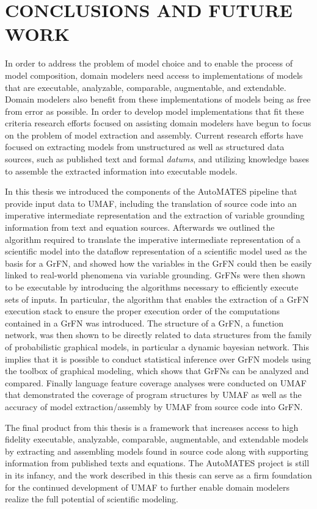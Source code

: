 \chapter{CONCLUSIONS AND FUTURE WORK\label{chapter:conc_and_future}}
In order to address the problem of model choice and to enable the process of model composition, domain modelers need access to implementations of models that are executable, analyzable, comparable, augmentable, and extendable.
Domain modelers also benefit from these implementations of models being as free from error as possible.
In order to develop model implementations that fit these criteria research efforts focused on assisting domain modelers have begun to focus on the problem of model extraction and assembly.
Current research efforts have focused on extracting models from unstructured as well as structured data sources, such as published text and formal \textit{datums}, and utilizing knowledge bases to assemble the extracted information into executable models.

In this thesis we introduced the components of the AutoMATES pipeline that provide input data to UMAF, including the translation of source code into an imperative intermediate representation and the extraction of variable grounding information from text and equation sources.
Afterwards we outlined the algorithm required to translate the imperative intermediate representation of a scientific model into the dataflow representation of a scientific model used as the basis for a GrFN, and showed how the variables in the GrFN could then be easily linked to real-world phenomena via variable grounding.
GrFNs were then shown to be executable by introducing the algorithms necessary to efficiently execute sets of inputs.
In particular, the algorithm that enables the extraction of a GrFN execution stack to ensure the proper execution order of the computations contained in a GrFN was introduced.
The structure of a GrFN, a function network, was then shown to be directly related to data structures from the family of probabilistic graphical models, in particular a dynamic bayesian network.
This implies that it is possible to conduct statistical inference over GrFN models using the toolbox of graphical modeling, which shows that GrFNs can be analyzed and compared.
Finally language feature coverage analyses were conducted on UMAF that demonstrated the coverage of program structures by UMAF as well as the accuracy of model extraction/assembly by UMAF from source code into GrFN.

The final product from this thesis is a framework that increases access to high fidelity executable, analyzable, comparable, augmentable, and extendable models by extracting and assembling models found in source code along with supporting information from published texts and equations.
The AutoMATES project is still in its infancy, and the work described in this thesis can serve as a firm foundation for the continued development of UMAF to further enable domain modelers realize the full potential of scientific modeling.

